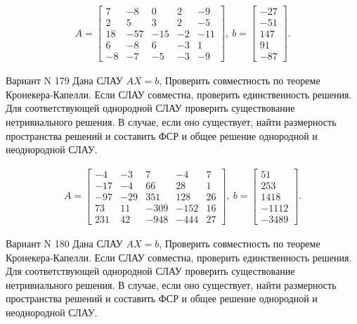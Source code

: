 \documentclass[11pt]{report}
\begin{document}
\begin{align*}
 A = \left[\begin{matrix}7 & -8 & 0 & 2 & -9\\2 & 5 & 3 & 2 & -5\\18 & -57 & -15 & -2 & -11\\6 & -8 & 6 & -3 & 1\\-8 & -7 & -5 & -3 & -9\end{matrix}\right],
\ b = \left[\begin{matrix}-27\\-51\\147\\91\\-87\end{matrix}\right]. 
 \end{align*}

Вариант N 179
Дана СЛАУ $AX = b$,
Проверить совместность по теореме Кронекера-Капелли. Если СЛАУ совместна, проверить единственность решения.
Для соответствующей однородной СЛАУ проверить существование нетривиального решения. В случае, если оно существует,
найти размерность пространства решений и составить ФСР и общее решение однородной  и неоднородной СЛАУ.


\begin{align*}
 A = \left[\begin{matrix}-4 & -3 & 7 & -4 & 7\\-17 & -4 & 66 & 28 & 1\\-97 & -29 & 351 & 128 & 26\\73 & 11 & -309 & -152 & 16\\231 & 42 & -948 & -444 & 27\end{matrix}\right],
\ b = \left[\begin{matrix}51\\253\\1418\\-1112\\-3489\end{matrix}\right]. 
 \end{align*}

Вариант N 180
Дана СЛАУ $AX = b$,
Проверить совместность по теореме Кронекера-Капелли. Если СЛАУ совместна, проверить единственность решения.
Для соответствующей однородной СЛАУ проверить существование нетривиального решения. В случае, если оно существует,
найти размерность пространства решений и составить ФСР и общее решение однородной  и неоднородной СЛАУ.
\end{document}
